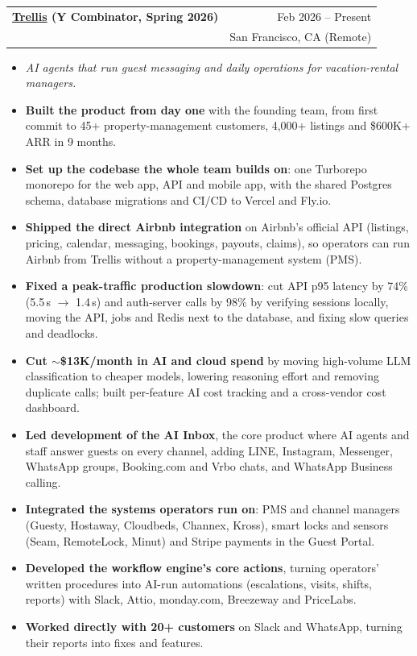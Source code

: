 \documentclass[a4paper,11pt]{article}
\makeatletter
\newcommand{\resumeExp}[4]{
\vspace{0mm}\item[]
    \begin{tabular*}{\textwidth}[t]{l@{\extracolsep{\fill}}r}
        \hspace{-4.4mm} \small\textbf{#1} & {\footnotesize{#3}}\vspace{-1.2mm} \\
        \hspace{-4.3mm} \footnotesize{\text{#2}} & \footnotesize{#4} \\  
    \end{tabular*}
    \vspace{-6.1mm}
}
\newcommand{\resumeItemListStart}{\begin{justify}\begin{itemize}[leftmargin=3ex, rightmargin=2ex, noitemsep,labelsep=1.2mm,itemsep=0mm]\small}
\newcommand{\resumeItemListEnd}{\end{itemize}\end{justify}\vspace{-1.5mm}}
\makeatother
\begin{document}
\resumeExp
{\href{https://www.trellistech.com/}{Trellis} \textmd{\footnotesize(Y Combinator, Spring 2026)}}
{Founding Lead Engineer}
{Feb 2026 -- Present}
{San Francisco, CA (Remote)}
\resumeItemListStart
\item[] \textit{AI agents that run guest messaging and daily operations for vacation-rental managers.}
\item[$\bullet$] \textbf{Built the product from day one} with the founding team, from first commit to 45+ property-management customers, 4,000+ listings and \$600K+ ARR in 9 months.
\item[$\bullet$] \textbf{Set up the codebase the whole team builds on}: one Turborepo monorepo for the web app, API and mobile app, with the shared Postgres schema, database migrations and CI/CD to Vercel and Fly.io.
\item[$\bullet$] \textbf{Shipped the direct Airbnb integration} on Airbnb's official API (listings, pricing, calendar, messaging, bookings, payouts, claims), so operators can run Airbnb from Trellis without a property-management system (PMS).
\item[$\bullet$] \textbf{Fixed a peak-traffic production slowdown}: cut API p95 latency by 74\% (5.5\,s $\rightarrow$ 1.4\,s) and auth-server calls by 98\% by verifying sessions locally, moving the API, jobs and Redis next to the database, and fixing slow queries and deadlocks.
\item[$\bullet$] \textbf{Cut $\sim$\$13K/month in AI and cloud spend} by moving high-volume LLM classification to cheaper models, lowering reasoning effort and removing duplicate calls; built per-feature AI cost tracking and a cross-vendor cost dashboard.
\item[$\bullet$] \textbf{Led development of the AI Inbox}, the core product where AI agents and staff answer guests on every channel, adding LINE, Instagram, Messenger, WhatsApp groups, Booking.com and Vrbo chats, and WhatsApp Business calling.
\item[$\bullet$] \textbf{Integrated the systems operators run on}: PMS and channel managers (Guesty, Hostaway, Cloudbeds, Channex, Kross), smart locks and sensors (Seam, RemoteLock, Minut) and Stripe payments in the Guest Portal.
\item[$\bullet$] \textbf{Developed the workflow engine's core actions}, turning operators' written procedures into AI-run automations (escalations, visits, shifts, reports) with Slack, Attio, monday.com, Breezeway and PriceLabs.
\item[$\bullet$] \textbf{Worked directly with 20+ customers} on Slack and WhatsApp, turning their reports into fixes and features.
\resumeItemListEnd
\end{document}
